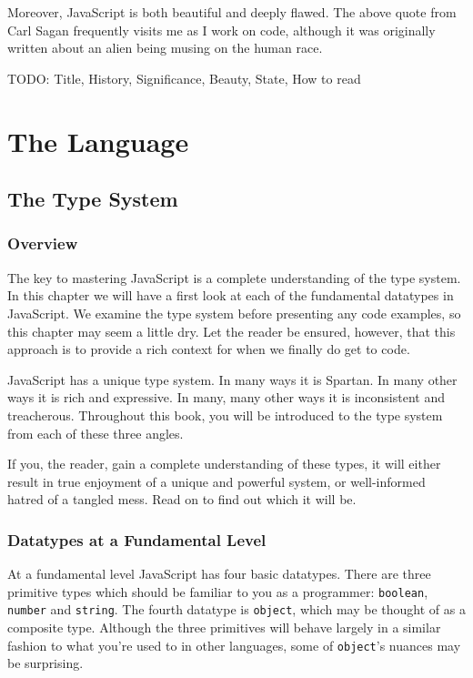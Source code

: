 \documentclass[11pt,letter]{book}
\begin{document}
    Moreover, JavaScript is both beautiful and deeply flawed. The above quote from Carl Sagan 
    frequently visits me as I work on code, although it was originally written about an alien being 
    musing on the human race.
    
    TODO: Title, History, Significance, Beauty, State, How to read
    
    \part{The Language}
    \chapter{The Type System}
    \section{Overview}
    The key to mastering JavaScript is a complete understanding of the type system. In this chapter
    we will have a first look at each of the fundamental datatypes in JavaScript. We examine the 
    type system before presenting any code examples, so this chapter may seem a little dry. Let the 
    reader be ensured, however, that this approach is to provide a rich context for when we finally
    do get to code.
    
    JavaScript has a unique type system. In many ways it is Spartan. In many other ways 
    it is rich and expressive. In many, many other ways it is inconsistent and treacherous.
    Throughout this book, you will be introduced to the type system from each of these three 
    angles.
    
    If you, the reader, gain a complete understanding of these types, it will either result 
    in true enjoyment of a unique and powerful system, or well-informed hatred of a tangled 
    mess. Read on to find out which it will be.
    
    \section{Datatypes at a Fundamental Level}
    At a fundamental level JavaScript has four basic datatypes. There are three primitive 
    types which should be familiar to you as a programmer: \texttt{boolean}, \texttt{number} 
    and \texttt{string}. The fourth datatype is \texttt{object}, which may be thought of as a 
    composite type. Although the three primitives will behave largely in a similar 
    fashion to what you're used to in other languages, some of \texttt{object}'s nuances 
    may be surprising.
    
\end{document}
